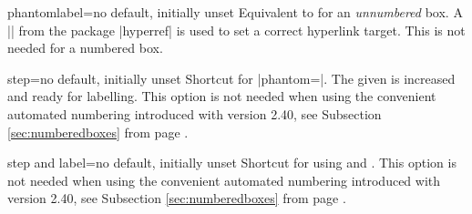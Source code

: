 

\begin{docTcbKey}[][doc new=2014-11-28]{phantomlabel}{=}{no default, initially unset}
Equivalent to  for an \emph{unnumbered} box.
A || from the package |hyperref| \cite{rahtz:hyperref} is used to set a correct
hyperlink target. This is not needed for a numbered box.
\end{docTcbKey}

\clearpage

\begin{docTcbKey}{step}{=}{no default, initially unset}
Shortcut for |phantom={}|. The given  is
increased and ready for labelling. This option is not needed when
using the convenient automated numbering introduced with version 2.40,
see Subsection \ref{sec:numberedboxes}
from page \pageref{sec:numberedboxes}.
\end{docTcbKey}

\begin{docTcbKey}{step and label}{=}{no default, initially unset}
Shortcut for using  and . This option is not needed when
using the convenient automated numbering introduced with version 2.40,
see Subsection \ref{sec:numberedboxes}
from page \pageref{sec:numberedboxes}.
\end{docTcbKey}


